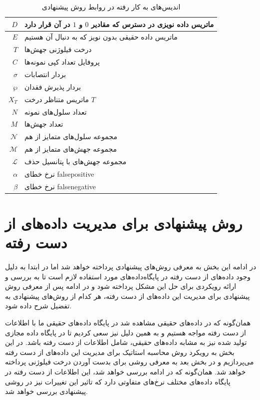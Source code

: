 	\begin{table}[ht]
	\caption{اندیس‌های به کار رفته در روابط روش پیشنهادی}
	\label{tab:ch_pm:firstpmIndices}
	\centering
	\onehalfspacing
	\begin{tabularx}{0.9\textwidth}{|r|X|}
		\hline
		$D$	& ماتریس داده نویزی در دسترس که مقادیر $0$ و $1$ در آن قرار دارد \\
		\hline
		$E$	& ماتریس داده حقیقی بدون نویز که به دنبال آن هستیم \\
		\hline
		$T$	& درخت فیلوژنی جهش‌ها \\
		\hline
		$C$ & پروفایل تعداد کپی نمونه‌ها \\
		\hline
		$\sigma$	 & بردار انتصابات \\
		\hline
		$\wp$ & بردار پذیرش فقدان$  $ \\
		\hline
		$X_T$	& ماتریس متناظر درخت $T$ \\
		\hline
		$N$	& تعداد سلول‌های نمونه \\
		\hline
		$M$	& تعداد جهش‌ها \\
		\hline
		$\mathcal{N}$ & مجموعه سلول‌های متمایز از هم \\
		\hline
		$\mathcal{M}$ & مجموعه جهش‌های متمایز از هم \\
		\hline
		$\mathcal{L}$ & مجموعه جهش‌های با پتانسیل حذف \\
		\hline
		$\alpha$	&  نرخ خطای \gls{falsepositive} \\
		\hline
		$\beta$	& نرخ خطای \gls{falsenegative} \\
		\hline
	\end{tabularx}
\end{table}



\section{روش پیشنهادی برای مدیریت داده‌های از دست رفته}

در ادامه این بخش به معرفی روش‌های پیشنهادی پرداخته خواهد شد اما در ابتدا به دلیل وجود داده‌های از دست رفته در پایگاه‌داده‌های مورد استفاده لازم است تا به بررسی و ارائه رویکردی برای حل این مشکل پرداخته شود و در ادامه پس از معرفی روش پیشنهادی برای مدیریت این داده‌های از دست رفته، هر کدام از روش‌های پیشنهادی به تفضیل شرح داده شود.

همان‌گونه که در داده‌های حقیقی مشاهده شد در پایگاه داده‌های حقیقی ما با اطلاعات از دست رفته مواجه هستیم و به همین دلیل نیز سعی کردیم تا در پایگاه داده مجازی تولید شده نیز به مشابه داده‌های حقیقی، شامل اطلاعات از دست رفته باشد. در این بخش به رویکرد روش محاسبه استاتیک برای مدیریت این داده‌های از دست رفته می‌پردازیم و در بخش بعد به معرفی روشی برای بدست آوردن درخت فیلوژنی پرداخته خواهد شد. همان‌گونه که در ادامه بررسی خواهد شد، این اطلاعات از دست رفته در پایگاه داده‌های مختلف نرخ‌های متفاوتی دارد که تاثیر این تغییرات نیز در روشی پیشنهادی بررسی خواهد شد.

